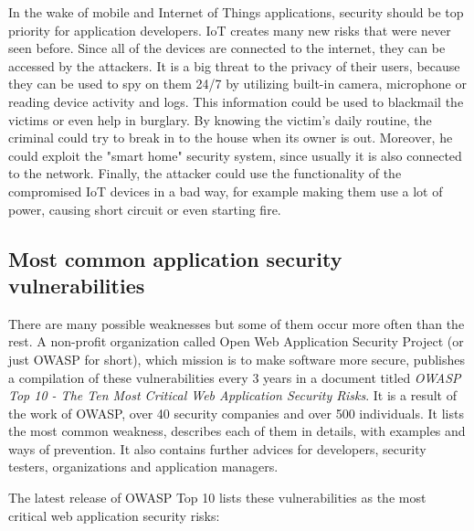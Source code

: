\documentclass[a4paper]{article}
\begin{document}
In the wake of mobile and Internet of Things applications, security should be
top priority for application developers. IoT creates many new risks that were
never seen before. Since all of the devices are connected to the internet, they
can be accessed by the attackers. It is a big threat to the privacy of their
users, because they can be used to spy on them 24/7 by utilizing built-in
camera, microphone or reading device activity and logs. This information could
be used to blackmail the victims or even help in burglary. By knowing the
victim's daily routine, the criminal could try to break in to the house when its
owner is out. Moreover, he could exploit the "smart home" security system, since
usually it is also connected to the network. Finally, the attacker could use the
functionality of the compromised IoT devices in a bad way, for example making
them use a lot of power, causing short circuit or even starting fire.

\newpage

\subsection{Most common application security vulnerabilities}

There are many possible weaknesses but some of them occur more often than the
rest. A non-profit organization called Open Web Application Security Project
(or just OWASP for short), which mission is to make software more secure,
publishes a compilation of these vulnerabilities every 3 years in a document
titled \textit{OWASP Top 10 - The Ten Most Critical Web Application Security
Risks}. It is a result of the work of OWASP, over 40 security companies and over
500 individuals. It lists the most common weakness, describes each of them in
details, with examples and ways of prevention. It also contains further advices
for developers, security testers, organizations and application managers.

The latest release of OWASP Top 10 lists these vulnerabilities as the most
critical web application security risks:
\end{document}
